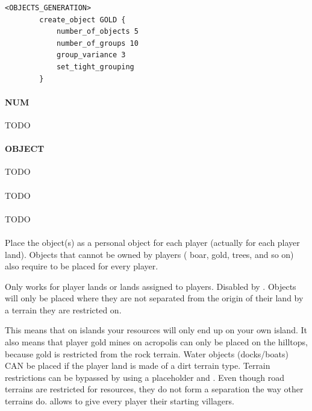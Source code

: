 \begin{appendices}
    \begin{lstlisting}[language={rms}, label={lst:groupvariance}, caption={Example showing how you can create different groups of object in the whole map, with different number of objects in each group.}]
        <OBJECTS_GENERATION>
        create_object GOLD {
            number_of_objects 5
            number_of_groups 10
            group_variance 3
            set_tight_grouping
        }
    \end{lstlisting}

    \paragraph{ NUM}

    TODO

    \paragraph{ OBJECT}

    TODO

    \paragraph{}

    TODO 

    \paragraph{}

    TODO

    \paragraph{}

    Place the object(s) as a personal object for each player (actually for each player land). Objects that cannot be owned by players (\eg{} boar, gold, trees, and so on) also require  to be placed for every player.

    Only works for player lands or lands assigned to players. Disabled by . Objects will only be placed where they are not separated from the origin of their land by a terrain they are restricted on.

    This means that on islands your resources will only end up on your own island. It also means that player gold mines on acropolis can only be placed on the hilltops, because gold is restricted from the rock terrain. Water objects (docks/boats) CAN be placed if the player land is made of a dirt terrain type. Terrain restrictions can be bypassed by using a placeholder and . Even though road terrains are restricted for resources, they do not form a separation the way other terrains do.  allows to give every player their starting villagers.


\end{appendices}
